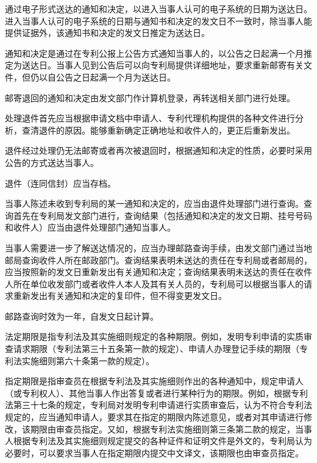通过电子形式送达的通知和决定，以进入当事人认可的电子系统的日期为送达日。进入当事人认可的电子系统的日期与通知书和决定的发文日不一致时，除当事人能提供证据外，该通知书和决定的发文日推定为送达日。

通知和决定是通过在专利公报上公告方式通知当事人的，以公告之日起满一个月推定为送达日。当事人见到公告后可以向专利局提供详细地址，要求重新邮寄有关文件，但仍以自公告之日起满一个月为送达日。

邮寄退回的通知和决定由发文部门作计算机登录，再转送相关部门进行处理。

处理退件首先应当根据申请文档中申请人、专利代理机构提供的各种文件进行分析，查清退件的原因。能够重新确定正确地址和收件人的，更正后重新发出。

退件经过处理仍无法邮寄或者再次被退回时，根据通知和决定的性质，必要时采用公告的方式送达当事人。

退件（连同信封）应当存档。

当事人陈述未收到专利局的某一通知和决定的，应当由退件处理部门进行查询。查询首先在专利局发文部门进行，查询结果（包括通知和决定的发文日期、挂号号码和收件人）应当由退件处理部门通知当事人。

当事人需要进一步了解送达情况的，应当办理邮路查询手续，由发文部门通过当地邮局查询收件人所在邮政部门。查询结果表明未送达的责任在专利局或者邮局的，应当按照新的发文日重新发出有关通知和决定；查询结果表明未送达的责任在收件人所在单位收发部门或者收件人本人及其有关人员的，专利局可以根据当事人的请求重新发出有关通知和决定的复印件，但不得变更发文日。

邮路查询时效为一年，自发文日起计算。

法定期限是指专利法及其实施细则规定的各种期限。例如，发明专利申请的实质审查请求期限（专利法第三十五条第一款的规定）、申请人办理登记手续的期限（专利法实施细则第六十条第一款的规定）。

指定期限是指审查员在根据专利法及其实施细则作出的各种通知中，规定申请人（或专利权人）、其他当事人作出答复或者进行某种行为的期限。例如，根据专利法第三十七条的规定，专利局对发明专利申请进行实质审查后，认为不符合专利法规定的，应当通知申请人，要求其在指定的期限内陈述意见，或者对其申请进行修改，该期限由审查员指定。又如，根据专利法实施细则第三条第二款的规定，当事人根据专利法及其实施细则规定提交的各种证件和证明文件是外文的，专利局认为必要时，可以要求当事人在指定期限内提交中文译文，该期限也由审查员指定。

